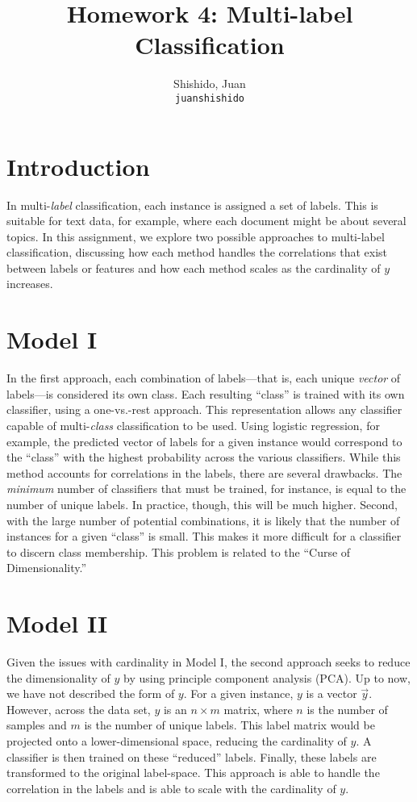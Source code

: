 \documentclass[11pt]{article}
\title{Homework 4: Multi-label Classification}
\author{
  Shishido, Juan\\
  \texttt{juanshishido}
}
\begin{document}
\maketitle

\section{Introduction}

In multi-\textit{label} classification, each instance is assigned a set of
labels. This is suitable for text data, for example, where each document might
be about several topics. In this assignment, we explore two possible approaches 
to multi-label classification, discussing how each method handles the
correlations that exist between labels or features and how each method scales
as the cardinality of $y$ increases.

\section{Model I}

In the first approach, each combination of labels---that is, each unique
\textit{vector} of labels---is considered its own class. Each resulting
``class'' is trained with its own classifier, using a one-vs.-rest approach.
This representation allows any classifier capable of multi-\textit{class}
classification to be used. Using logistic regression, for example, the
predicted vector of labels for a given instance would correspond to the
``class'' with the highest probability across the various classifiers. While
this method accounts for correlations in the labels, there are several
drawbacks. The \textit{minimum} number of classifiers that must be trained, for 
instance, is equal to the number of unique labels. In practice, though, this
will be much higher. Second, with the large number of potential combinations,
it is likely that the number of instances for a given ``class'' is small. This
makes it more difficult for a classifier to discern class membership. This
problem is related to the ``Curse of Dimensionality.''

\section{Model II}

Given the issues with cardinality in Model I, the second approach seeks to
reduce the dimensionality of $y$ by using principle component analysis (PCA).
Up to now, we have not described the form of $y$. For a given instance, $y$ is
a vector $\vec{y}$. However, across the data set, $y$ is an $n \times m$ matrix,
where $n$ is the number of samples and $m$ is the number of unique labels. This
label matrix would be projected onto a lower-dimensional space, reducing the
cardinality of $y$. A classifier is then trained on these ``reduced'' labels.
Finally, these labels are transformed to the original label-space. This
approach is able to handle the correlation in the labels and is able to scale
with the cardinality of $y$.
\end{document}
